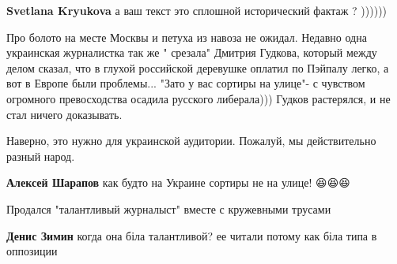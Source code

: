 \begin{itemize}
 
\textbf{Svetlana Kryukova} а ваш текст это сплошной исторический фактаж ? ))))))

 

Про болото на месте Москвы и петуха из навоза не ожидал. Недавно одна
украинская журналистка так же " срезала" Дмитрия Гудкова, который между делом
сказал, что в глухой российской деревушке оплатил по Пэйпалу легко, а вот в
Европе были проблемы... "Зато у вас сортиры на улице"- с чувством огромного
превосходства осадила русского либерала))) Гудков растерялся, и не стал ничего
доказывать.

Наверно, это нужно для украинской аудитории. Пожалуй, мы действительно разный
народ.

 
\textbf{Алексей Шарапов} как будто на Украине сортиры не на улице! 😆😆😆

 
Продался "талантливый журналыст" вместе с кружевными трусами

 
\textbf{Денис Зимин} когда она біла талантливой? ее читали потому как біла типа в оппозиции

 

\end{itemize}

